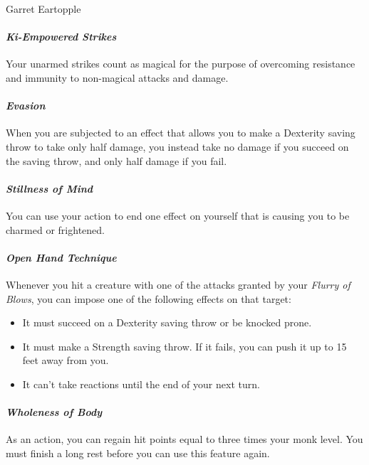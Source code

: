 \documentclass[10pt,twoside,twocolumn]{book}
\begin{document}
\begin{rpg-monsterbox}{Garret Eartopple}
   \paragraph{\emph{Ki-Empowered Strikes}}
   Your unarmed strikes count as magical for the purpose of overcoming resistance and immunity to non-magical attacks and damage.

   \paragraph{\emph{Evasion}}
   When you are subjected to an effect that allows you to make a Dexterity saving throw to take only half damage, you instead take no damage if you succeed on the saving throw, and only half damage if you fail.

   \paragraph{\emph{Stillness of Mind}}
   You can use your action to end one effect on yourself that is causing you to be charmed or frightened.

   \paragraph{\emph{Open Hand Technique}}
   Whenever you hit a creature with one of the attacks granted by your \emph{Flurry of Blows}, you can impose one of the following effects on that target:
    \begin{itemize}
       \item It must succeed on a Dexterity saving throw or be knocked prone.
       \item It must make a Strength saving throw. If it fails, you can push it up to 15 feet away from you.
       \item It can't take reactions until the end of your next turn.
    \end{itemize}

   \paragraph{\emph{Wholeness of Body}}
   As an action, you can regain hit points equal to three times your monk level.
   You must finish a long rest before you can use this feature again.


\end{rpg-monsterbox}
\end{document}
